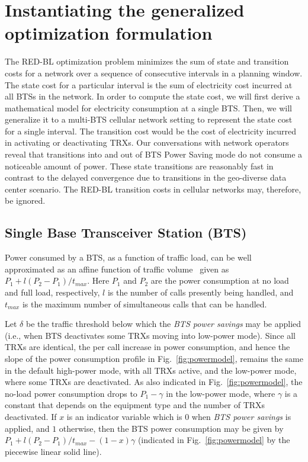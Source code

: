 \section{Instantiating the generalized optimization formulation} %
\label{sec:case2:instantiate}
The RED-BL optimization problem minimizes the sum of state and transition costs for a network over a sequence of consecutive intervals in a planning window. The state cost for a particular interval is the sum of electricity cost incurred at all BTSs in the network. In order to compute the state cost, we will first derive a mathematical model for electricity consumption at a single BTS. Then, we will generalize it to a multi-BTS cellular network setting to represent the state cost for a single interval. The transition cost would be the cost of electricity incurred in activating or deactivating TRXs. Our conversations with network operators reveal that transitions into and out of BTS Power Saving mode do not consume a noticeable amount of power. These state transitions are reasonably fast in contrast to the delayed convergence due to transitions in the geo-diverse data center scenario. The RED-BL transition costs in cellular networks may, therefore, be ignored.

\subsection{Single Base Transceiver Station (BTS)}
\label{sec:case2:instantiate:single-cell}
Power consumed by a BTS, as a function of traffic load, can be
well approximated as an affine function  of traffic volume~\cite{Peng:2011:BTSSaving:Mobicom} given as
$P_1+l(P_2-P_1)/t_{max}$. Here $P_1$ and $P_2$ are the power
consumption at no load and full load, respectively, $l$ is the
number of calls presently being handled, and $t_{max}$ is the
maximum number of simultaneous calls that can be handled.

Let $\delta$ be the traffic threshold below which the \textit{BTS power savings} may be applied (i.e., when BTS deactivates some TRXs moving into low-power mode). Since all TRXs are identical, the per call increase in power consumption, and hence the slope of the power consumption profile in Fig.~\ref{fig:powermodel}, remains the same in the default high-power mode, with all TRXs active, and the low-power mode, where some TRXs are deactivated. As also indicated in Fig.~\ref{fig:powermodel}, the no-load power consumption drops to $P_1-\gamma$ in the low-power mode, where $\gamma$ is a constant that depends on the equipment type and the number of TRXs deactivated. If $x$ is an indicator variable which is $0$ when \textit{BTS power savings} is applied, and $1$ otherwise, then the BTS power consumption may be given by $P_1+l(P_2-P_1)/t_{max} - (1-x)\gamma$ (indicated in Fig.~\ref{fig:powermodel} by the piecewise linear solid line).


